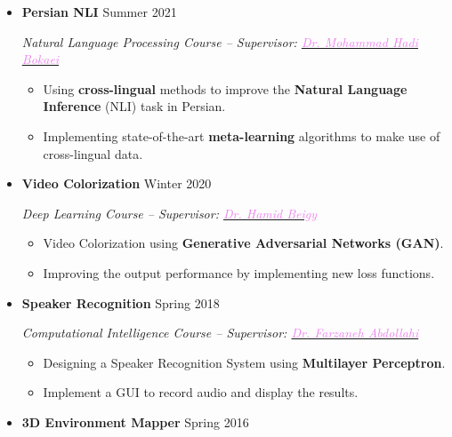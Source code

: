 \documentclass[11pt,a4paper,roman]{moderncv} %
\begin{document}
\begin{itemize}
	\item \textbf{Persian NLI} \hfill Summer 2021
	
	\emph{Natural Language Processing Course -- Supervisor: \href{http://ce.sharif.edu/~bokaei}{\textcolor{violet}{Dr. Mohammad Hadi Bokaei}}}
	
	\begin{itemize}
		\item Using \textbf{cross-lingual} methods to improve the \textbf{Natural Language Inference} (NLI) task in Persian.
		\item Implementing state-of-the-art \textbf{meta-learning} algorithms to make use of cross-lingual data.
	\end{itemize}
	
	\vspace{3pt}
	
	\item \textbf{Video Colorization} \hfill Winter 2020
	
	\emph{Deep Learning Course -- Supervisor: \href{http://sharif.edu/~beigy}{\textcolor{violet}{Dr. Hamid Beigy}}}
	
	\begin{itemize}
		\item Video Colorization using \textbf{Generative Adversarial Networks (GAN)}.
		\item Improving the output performance by implementing new loss functions.
	\end{itemize}
	
	\vspace{3pt}
	
	\item \textbf{Speaker Recognition} \hfill Spring 2018
	
	\emph{Computational Intelligence Course -- Supervisor: \href{http://ele.aut.ac.ir/~abdollahi}{\textcolor{violet}{Dr. Farzaneh Abdollahi}}}
	
	\begin{itemize}
		\item Designing a Speaker Recognition System using \textbf{Multilayer Perceptron}.
		\item Implement a GUI to record audio and display the results. 
	\end{itemize}
	
	\vspace{3pt}
	
	\item \textbf{3D Environment Mapper} \hfill Spring 2016
	

\end{itemize}
\end{document}
